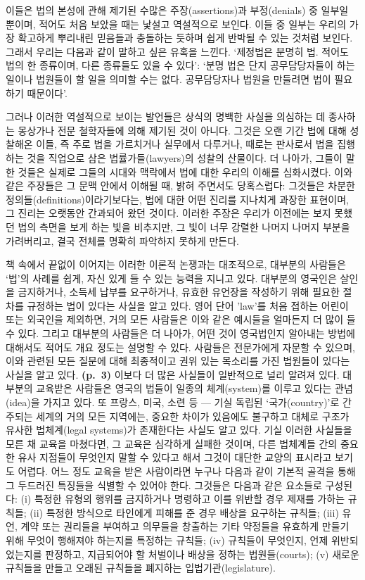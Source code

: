 이들은 법의 본성에 관해 제기된 수많은 주장(assertions)과 부정(denials)
중 일부일 뿐이며, 적어도 처음 보았을 때는 낯설고 역설적으로 보인다. 이들
중 일부는 우리의 가장 확고하게 뿌리내린 믿음들과 충돌하는 듯하며 쉽게
반박될 수 있는 것처럼 보인다. 그래서 우리는 다음과 같이 말하고 싶은
유혹을 느낀다. ‘제정법은 분명히 법. 적어도 법의 한 종류이며,
다른 종류들도 있을 수 있다’: ‘분명 법은 단지 공무담당자들이 하는 일이나
법원들이 할 일을 의미할 수는 없다. 공무담당자나 법원을 만들려면 법이
필요하기 때문이다’.

그러나 이러한 역설적으로 보이는 발언들은 상식의 명백한 사실을 의심하는
데 종사하는 몽상가나 전문 철학자들에 의해 제기된 것이 아니다. 그것은
오랜 기간 법에 대해 성찰해온 이들, 즉 주로 법을 가르치거나 실무에서
다루거나, 때로는 판사로서 법을 집행하는 것을 직업으로 삼은
법률가들(lawyers)의 성찰의 산물이다. 더 나아가, 그들이 말한 것들은
실제로 그들의 시대와 맥락에서 법에 대한 우리의 이해를 심화시켰다. 이와
같은 주장들은 그 문맥 안에서 이해될 때, 밝혀 주면서도 
당혹스럽다: 그것들은 차분한 정의들(definitions)이라기보다는, 법에 대한
어떤 진리를 지나치게 과장한 표현이며, 그 진리는 오랫동안 간과되어 왔던
것이다. 이러한 주장은 우리가 이전에는 보지 못했던 법의 측면을 보게 하는
빛을 비추지만, 그 빛이 너무 강렬한 나머지 나머지 부분을 가려버리고, 결국
전체를 명확히 파악하지 못하게 만든다.

책 속에서 끝없이 이어지는 이러한 이론적 논쟁과는 대조적으로, 대부분의
사람들은 ‘법’의 사례를 쉽게, 자신 있게 들 수 있는 능력을 지니고 있다.
대부분의 영국인은 살인을 금지하거나, 소득세 납부를 요구하거나, 유효한
유언장을 작성하기 위해 필요한 절차를 규정하는 법이 있다는 사실을 알고
있다. 영어 단어 'law'를 처음 접하는 어린이 또는 외국인을 제외하면, 거의
모든 사람들은 이와 같은 예시들을 얼마든지 더 많이 들 수 있다. 그리고
대부분의 사람들은 더 나아가, 어떤 것이 영국법인지 알아내는 방법에
대해서도 적어도 개요 정도는 설명할 수 있다. 사람들은 전문가에게 자문할
수 있으며, 이와 관련된 모든 질문에 대해 최종적이고 권위 있는 목소리를
가진 법원들이 있다는 사실을 알고 있다. \textbf{(p.~3)} 이보다 더 많은
사실들이 일반적으로 널리 알려져 있다. 대부분의 교육받은 사람들은 영국의
법들이 일종의 체계(system)를 이루고 있다는 관념(idea)을 가지고 있다. 또
프랑스, 미국, 소련 등 --- 기실 독립된 ‘국가(country)’로 간주되는 세계의
거의 모든 지역에는, 중요한 차이가 있음에도 불구하고 대체로 구조가 유사한
법체계(legal systems)가 존재한다는 사실도 알고 있다. 기실 이러한
사실들을 모른 채 교육을 마쳤다면, 그 교육은 심각하게 실패한 것이며, 다른
법체계들 간의 중요한 유사 지점들이 무엇인지 말할 수 있다고 해서 그것이
대단한 교양의 표시라고 보기도 어렵다. 어느 정도 교육을 받은 사람이라면
누구나 다음과 같이 기본적 골격을 통해 그 두드러진 특징들을 식별할 수
있어야 한다. 그것들은 다음과 같은 요소들로 구성된다: (i) 특정한 유형의
행위를 금지하거나 명령하고 이를 위반할 경우 제재를 가하는 규칙들; (ii)
특정한 방식으로 타인에게 피해를 준 경우 배상을 요구하는 규칙들; (iii)
유언, 계약 또는 권리들을 부여하고 의무들을 창출하는 기타 약정들을
유효하게 만들기 위해 무엇이 행해져야 하는지를 특정하는 규칙들; (iv)
규칙들이 무엇인지, 언제 위반되었는지를 판정하고, 지급되어야 할 처벌이나
배상을 정하는 법원들(courts); (v) 새로운 규칙들을 만들고 오래된 규칙들을
폐지하는 입법기관(legislature).

